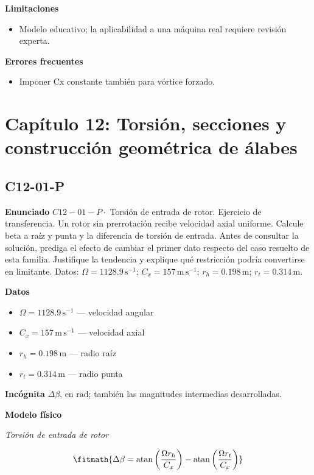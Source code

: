 \documentclass[10pt,openany]{book}
\begin{document}
\noindent\textbf{Limitaciones}
\begin{itemize}
\item Modelo educativo; la aplicabilidad a una máquina real requiere revisión experta.
\end{itemize}

\noindent\textbf{Errores frecuentes}
\begin{itemize}
\item Imponer Cx constante también para vórtice forzado.
\end{itemize}
\section{Capítulo 12: Torsión, secciones y construcción geométrica de álabes}
\subsection*{C12-01-P}

\noindent\textbf{Enunciado}
\(C12-01-P \cdot\) Torsión de entrada de rotor. Ejercicio de transferencia. Un rotor sin prerrotación recibe velocidad axial uniforme. Calcule beta a raíz y punta y la diferencia de torsión de entrada. Antes de consultar la solución, prediga el efecto de cambiar el primer dato respecto del caso resuelto de esta familia. Justifique la tendencia y explique qué restricción podría convertirse en limitante. Datos: \(\Omega=1128.9\, \mathrm{s}^{-1}\); \(C_x=157\, \mathrm{m}\,\mathrm{s}^{-1}\); \(r_h=0.198\, \mathrm{m}\); \(r_t=0.314\, \mathrm{m}\).

\noindent\textbf{Datos}
\begin{itemize}
\item $\Omega = 1128.9\,\mathrm{s}^{-1}$ — velocidad angular
\item $C_x = 157\,\mathrm{m}\,\mathrm{s}^{-1}$ — velocidad axial
\item $r_h = 0.198\,\mathrm{m}$ — radio raíz
\item $r_t = 0.314\,\mathrm{m}$ — radio punta
\end{itemize}

\noindent\textbf{Incógnita}
$\Delta\beta$, en $\mathrm{rad}$; también las magnitudes intermedias desarrolladas.

\noindent\textbf{Modelo físico}

\noindent\textit{Torsión de entrada de rotor}

\[
\fitmath{\Delta\beta=\operatorname{atan}{\left(\frac{\Omega r_h}{C_x} \right)} - \operatorname{atan}{\left(\frac{\Omega r_t}{C_x} \right)}}
\]
\end{document}
